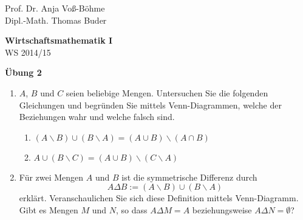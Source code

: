 \documentclass[12pt,a4paper]{scrreprt}
\begin{document}
 
\begin{flushleft}
Prof. Dr.  Anja Voß-Böhme \\
Dipl.-Math. Thomas Buder
\end{flushleft}

\begin{center}{\large\bf Wirtschaftsmathematik I} \\ WS 2014/15 \end{center}

\begin{center}{\large\bf Übung 2 } 
\end{center}


\bigskip
\begin{enumerate}
 			
		 \item $A$, $B$ und $C$ seien beliebige Mengen. Untersuchen Sie die folgenden 							Gleichungen und begründen Sie mittels Venn-Diagrammen, welche der 									Beziehungen wahr und welche falsch sind.
		 				\begin{enumerate}
		 				\item $(A \backslash B) \cup (B \backslash A) = (A \cup B) \backslash (A                    \cap B)$
						\item $A \cup (B \backslash C) = (A \cup B) \backslash (C \backslash A)$
					\end{enumerate}
								\item Für zwei Mengen $A$ und $B$ ist die symmetrische Differenz     
								durch
						\[A \Delta B := (A \backslash B) \cup (B \backslash A)\]
						erklärt. Veranschaulichen Sie sich diese Definition mittels 
						Venn-Diagramm. 
						Gibt es Mengen $M$ und $N$, so dass $A\Delta M = A$ 
						beziehungsweise $A \Delta N = \emptyset$?		
					

\end{enumerate}
\end{document}
